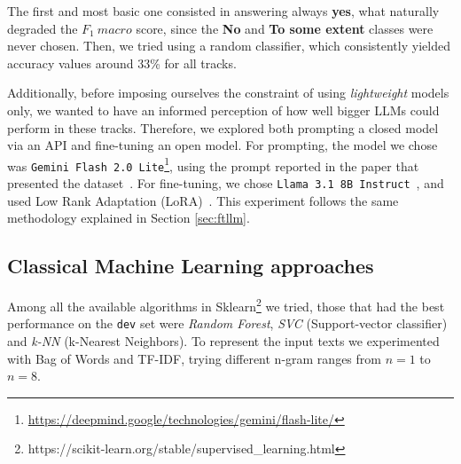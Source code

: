 \documentclass[11pt]{article}
\begin{document}
The first and most basic one consisted in answering always \textbf{yes}, what naturally degraded the $F_1\ macro$ score, since the \textbf{No} and \textbf{To some extent} classes were never chosen.
Then, we tried using a random classifier, which consistently yielded accuracy values around 33\% for all tracks.

Additionally, before imposing ourselves the constraint of using \textit{lightweight} models only, we wanted to have an informed perception of how well bigger LLMs could perform in these tracks.
Therefore, we explored both prompting a closed model via an API and fine-tuning an open model.
For prompting, the model we chose was \texttt{Gemini Flash 2.0 Lite}\footnote{\url{https://deepmind.google/technologies/gemini/flash-lite/}}, using the prompt reported in the paper that presented the dataset~\citep{maurya-etal-2025-unifying}.
For fine-tuning, we chose \texttt{Llama 3.1 8B Instruct}~\cite{llama3modelcard}, and used Low Rank Adaptation (LoRA)~\cite{hu2022lora}.
This experiment follows the same methodology explained in Section \ref{sec:ftllm}.


\subsection{Classical Machine Learning approaches}
Among all the available algorithms in Sklearn\footnote{https://scikit-learn.org/stable/supervised\_learning.html} we tried, those that had the best performance on the \texttt{dev} set were \textit{Random Forest}, \textit{SVC} (Support-vector classifier) and \textit{k-NN} (k-Nearest Neighbors).
To represent the input texts we experimented with Bag of Words and TF-IDF, trying different n-gram ranges from $n=1$ to $n=8$. 
\end{document}
